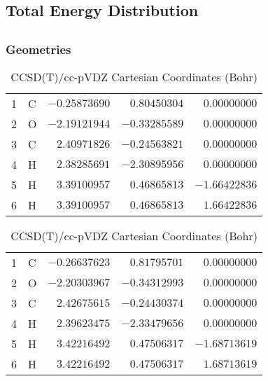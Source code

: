 \documentclass[10pt,oneside]{article}
\begin{document}
\begin{table}
\subsection*{Total Energy Distribution}
\centering\end{table}

\clearpage

\subsection{}

\begin{table}[h!]
\subsubsection*{Geometries}
\begin{multicols}{2}
\centering
\caption{CCSD(T)/cc-pVTZ Cartesian Coordinates (Bohr)}
\begin{tabular}{llrrr}
\toprule
1  & C  & $-0.25873690$ & $ 0.80450304$ & $ 0.00000000$ \\
2  & O  & $-2.19121944$ & $-0.33285589$ & $ 0.00000000$ \\
3  & C  & $ 2.40971826$ & $-0.24563821$ & $ 0.00000000$ \\
4  & H  & $ 2.38285691$ & $-2.30895956$ & $ 0.00000000$ \\
5  & H  & $ 3.39100957$ & $ 0.46865813$ & $-1.66422836$ \\
6  & H  & $ 3.39100957$ & $ 0.46865813$ & $ 1.66422836$ \\
\bottomrule
\end{tabular}
\caption{CCSD(T)/cc-pVDZ Cartesian Coordinates (Bohr)}
\begin{tabular}{llrrr}
\toprule
1  & C  & $-0.26637623$ & $ 0.81795701$ & $ 0.00000000$ \\
2  & O  & $-2.20303967$ & $-0.34312993$ & $ 0.00000000$ \\
3  & C  & $ 2.42675615$ & $-0.24430374$ & $ 0.00000000$ \\
4  & H  & $ 2.39623475$ & $-2.33479656$ & $ 0.00000000$ \\
5  & H  & $ 3.42216492$ & $ 0.47506317$ & $-1.68713619$ \\
6  & H  & $ 3.42216492$ & $ 0.47506317$ & $ 1.68713619$ \\
\bottomrule
\end{tabular}
\end{multicols}
\end{table}
\end{document}
